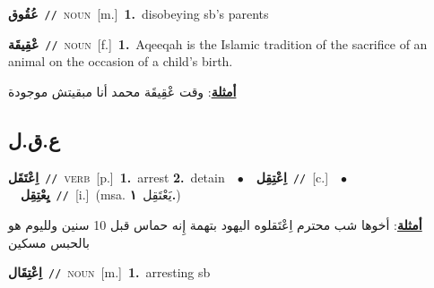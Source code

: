 \documentclass[10pt,a4paper,twoside]{article} %
\begin{document}
\begin{multicols}{2}
{\setlength\topsep{0pt}\textbf{\foreignlanguage{arabic}{عُقُوق}}\ {\color{gray}\texttt{//}\color{black}}\ \textsc{noun}\ [m.]\ \textbf{1.}~disobeying sb's parents\ } \vspace{2mm}

{\setlength\topsep{0pt}\textbf{\foreignlanguage{arabic}{عْقِيقَة}}\ {\color{gray}\texttt{//}\color{black}}\ \textsc{noun}\ [f.]\ \textbf{1.}~Aqeeqah is the Islamic tradition of the sacrifice of an animal on the occasion of a child's birth.\  \begin{flushright}\color{gray}\foreignlanguage{arabic}{\textbf{\underline{\foreignlanguage{arabic}{أمثلة}}}: وقت عْقِيقَة محمد أنا مبقيتش موجودة}\end{flushright}\color{black}} \vspace{2mm}

\vspace{-3mm}
\subsection*{\color{blue}\foreignlanguage{arabic}{ع.ق.ل}\color{blue}{}} 

{\setlength\topsep{0pt}\textbf{\foreignlanguage{arabic}{اِعْتَقَل}}\ {\color{gray}\texttt{//}\color{black}}\ \textsc{verb}\ [p.]\ \textbf{1.}~arrest  \textbf{2.}~detain\ \ $\bullet$\ \ \setlength\topsep{0pt}\textbf{\foreignlanguage{arabic}{اِعْتِقِل}}\ {\color{gray}\texttt{//}\color{black}}\ [c.]\ \ $\bullet$\ \ \setlength\topsep{0pt}\textbf{\foreignlanguage{arabic}{يِعْتِقِل}}\ {\color{gray}\texttt{//}\color{black}}\ [i.]\ \color{gray}(msa. \foreignlanguage{arabic}{يَعْتَقِل}~\foreignlanguage{arabic}{\textbf{١.}})\color{black}\  \begin{flushright}\color{gray}\foreignlanguage{arabic}{\textbf{\underline{\foreignlanguage{arabic}{أمثلة}}}: أخوها شب محترم اِعْتَقلوه اليهود بتهمة إِنه حماس قبل 10 سنين ولليوم هو بالحبس مسكين}\end{flushright}\color{black}} \vspace{2mm}

{\setlength\topsep{0pt}\textbf{\foreignlanguage{arabic}{اِعْتِقَال}}\ {\color{gray}\texttt{//}\color{black}}\ \textsc{noun}\ [m.]\ \textbf{1.}~arresting sb\ } \vspace{2mm}


\end{multicols}
\end{document}
